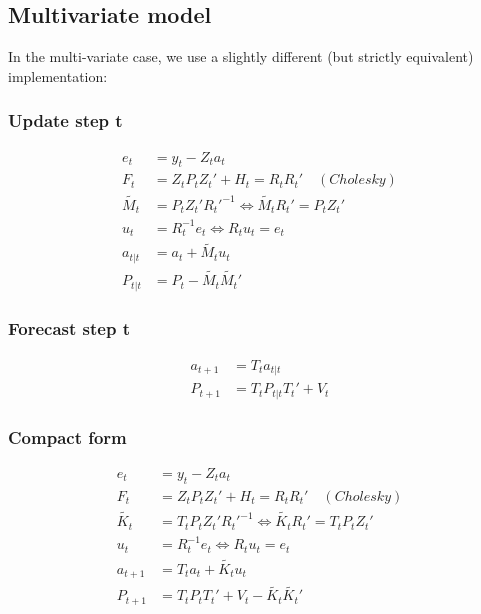 \documentclass[
  letterpaper,
  DIV=11,
  numbers=noendperiod]{scrreprt}
\begin{document}
\subsection{Multivariate model}\label{multivariate-model}

In the multi-variate case, we use a slightly different (but strictly
equivalent) implementation:

\subsubsection{Update step t}\label{update-step-t-1}

\[
\begin{align*}
e_t &= y_t - Z_t a_t \\
F_t &= Z_t P_t Z_t' + H_t = R_t R_t' \quad(Cholesky) \\
\tilde{M_t} &= P_t Z_t' {R_t'}^{-1} \Leftrightarrow \tilde{M_t} R_t' = P_t Z_t' \\
u_t &= R_t^{-1} e_t \Leftrightarrow R_t u_t = e_t \\
a_{t|t} &= a_t + \tilde{M_t} u_t \\
P_{t|t} &= P_t - \tilde{M_t}\tilde{M_t}'
\end{align*}
\]

\subsubsection{Forecast step t}\label{forecast-step-t-1}

\[
\begin{align*}
a_{t+1} &= T_t a_{t|t} \\
P_{t+1} &= T_t P_{t|t} T_t' + V_t
\end{align*}
\]

\subsubsection{Compact form}\label{compact-form-1}

\[
\begin{align*}
e_t &= y_t - Z_t a_t \\
F_t &= Z_t P_t Z_t' + H_t = R_t R_t' \quad(Cholesky) \\
\tilde{K_t} &=  T_t P_t Z_t' {R_t'}^{-1} \Leftrightarrow \tilde{K_t} R_t' = T_t P_t Z_t' \\
u_t &= R_t^{-1} e_t \Leftrightarrow R_t u_t = e_t \\
a_{t+1} &= T_t a_t + \tilde{K_t} u_t \\
P_{t+1} &= T_t P_{t} T_t' + V_t - \tilde{K_t}\tilde{K_t}' 
\end{align*}
\]
\end{document}
